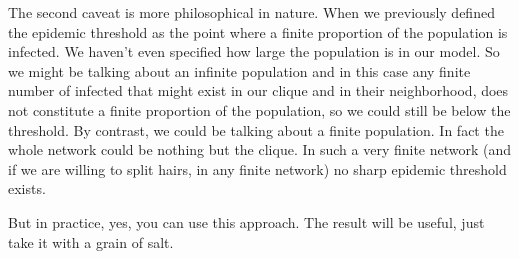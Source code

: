 The second caveat is more philosophical in nature. When we previously defined the epidemic threshold as the point where a finite proportion of the population is infected. We haven't even specified how large the population is in our model. So we might be talking about an infinite population and in this case any finite number of infected that might exist in our clique and in their neighborhood, does not constitute a finite proportion of the population, so we could still be below the threshold. By contrast, we could be talking about a finite population. In fact the whole network could be nothing but the clique. In such a very finite network (and if we are willing to split hairs, in any finite network) no sharp epidemic threshold exists. 

But in practice, yes, you can use this approach. The result will be useful, just take it with a grain of salt. 
